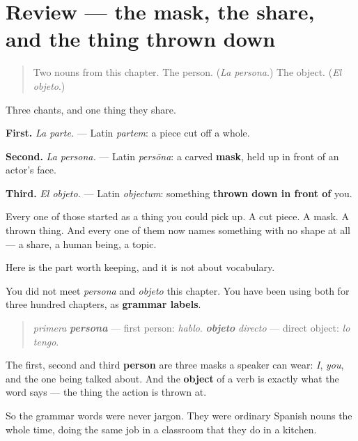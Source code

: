\section[(review)]{Review — the mask, the share, and the thing thrown down}

\label{lesson:ES-C345-repaso-persona-objeto}



\begin{quote}
Two nouns from this chapter. The person. (\emph{La persona}.) The object. (\emph{El objeto}.)
\end{quote}

\begin{grammarlens}[title={What you've built}]
Three chants, and one thing they share.

\textbf{First.} \emph{La parte.} — Latin \emph{partem}: a piece cut off a whole.

\textbf{Second.} \emph{La persona.} — Latin \emph{persōna}: a carved \textbf{mask}, held up in front of an actor's face.

\textbf{Third.} \emph{El objeto.} — Latin \emph{objectum}: something \textbf{thrown down in front of} you.

Every one of those started as a thing you could pick up. A cut piece. A mask. A thrown thing. And every one of them now names something with no shape at all — a share, a human being, a topic.
\end{grammarlens}

\begin{culture}
Here is the part worth keeping, and it is not about vocabulary.

You did not meet \emph{persona} and \emph{objeto} this chapter. You have been using both for three hundred chapters, as \textbf{grammar labels}.

\begin{quote}
\emph{primera} \emph{\textbf{persona}} — first person: \emph{hablo}. \emph{\textbf{objeto}} \emph{directo} — direct object: \emph{lo tengo}.
\end{quote}

The first, second and third \textbf{person} are three masks a speaker can wear: \emph{I}, \emph{you}, and the one being talked about. And the \textbf{object} of a verb is exactly what the word says — the thing the action is thrown at.

So the grammar words were never jargon. They were ordinary Spanish nouns the whole time, doing the same job in a classroom that they do in a kitchen.
\end{culture}

